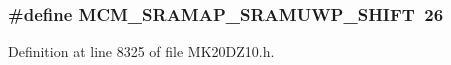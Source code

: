 \subsubsection[{\texorpdfstring{M\+C\+M\+\_\+\+S\+R\+A\+M\+A\+P\+\_\+\+S\+R\+A\+M\+U\+W\+P\+\_\+\+S\+H\+I\+FT}{MCM_SRAMAP_SRAMUWP_SHIFT}}]{\setlength{\rightskip}{0pt plus 5cm}\#define M\+C\+M\+\_\+\+S\+R\+A\+M\+A\+P\+\_\+\+S\+R\+A\+M\+U\+W\+P\+\_\+\+S\+H\+I\+FT~26}\hypertarget{group___m_c_m___register___masks_ga6c8ee7627c2a66ec379d94b9164deb41}{}\label{group___m_c_m___register___masks_ga6c8ee7627c2a66ec379d94b9164deb41}


Definition at line 8325 of file M\+K20\+D\+Z10.\+h.

